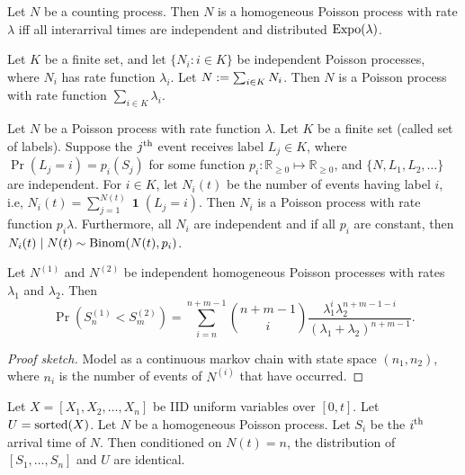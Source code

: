 \documentclass[a4paper, 12pt, fleqn]{article}
\DeclareMathOperator{\boolone}{\mathbf{1}}
\DeclareMathOperator{\Expo}{\opname{Expo}}
\begin{document}
\begin{theorem}
Let $N$ be a counting process. Then $N$ is a homogeneous Poisson process with rate $\lambda$
iff all interarrival times are independent and distributed $\Expo(\lambda)$.
\end{theorem}

\begin{theorem}
Let $K$ be a finite set, and let $\{N_i: i \in K\}$ be independent Poisson processes,
where $N_i$ has rate function $\lambda_i$. Let $N := \sum_{i \in K}N_i$.
Then $N$ is a Poisson process with rate function $\sum_{i \in K} \lambda_i$.
\end{theorem}

\begin{theorem}
Let $N$ be a Poisson process with rate function $\lambda$. Let $K$ be a finite set (called set of labels).
Suppose the $j^{\textrm{th}}$ event receives label $L_j \in K$, where $\Pr(L_j = i) = p_i(S_j)$
for some function $p_i: \mathbb{R}_{\ge 0} \mapsto \mathbb{R}_{\ge 0}$,
and $\{N, L_1, L_2, \ldots\}$ are independent.
For $i \in K$, let $N_i(t)$ be the number of events having label $i$, i.e,
$N_i(t) = \sum_{j=1}^{N(t)} \boolone(L_j = i)$.
Then $N_i$ is a Poisson process with rate function $p_i \lambda$.
Furthermore, all $N_i$ are independent and if all $p_i$ are constant, then
$N_i(t) \mid N(t) \sim \operatorname{Binom}(N(t), p_i)$.
\end{theorem}

\begin{lemma}
Let $N^{(1)}$ and $N^{(2)}$ be independent homogeneous Poisson processes
with rates $\lambda_1$ and $\lambda_2$. Then
\[ \Pr(S^{(1)}_n < S^{(2)}_m) = \sum_{i=n}^{n+m-1} \binom{n+m-1}{i}
    \frac{\lambda_1^i\lambda_2^{n+m-1-i}}{(\lambda_1 + \lambda_2)^{n+m-1}}. \]
\end{lemma}
\begin{proof}[Proof sketch]
Model as a continuous markov chain with state space $(n_1, n_2)$,
where $n_i$ is the number of events of $N^{(i)}$ that have occurred.
\end{proof}

\begin{theorem}
Let $X = [X_1, X_2, \ldots, X_n]$ be IID uniform variables over $[0, t]$.
Let $U = \operatorname{sorted}(X)$. Let $N$ be a homogeneous Poisson process.
Let $S_i$ be the $i^{\textrm{th}}$ arrival time of $N$.
Then conditioned on $N(t) = n$, the distribution of $[S_1, \ldots, S_n]$ and $U$ are identical.
\end{theorem}
\end{document}
